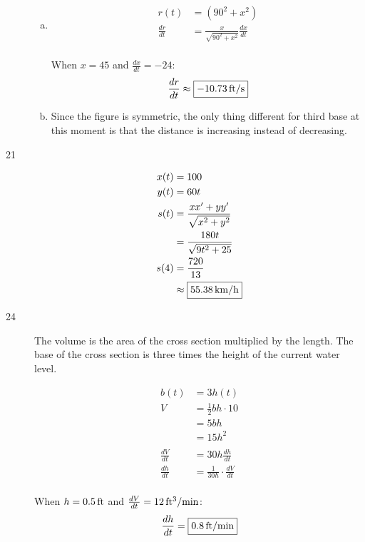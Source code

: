 \documentclass[letterpaper, landscape]{exam}
\begin{document}
\begin{description}
\begin{enumerate}[(a)]
        \item 
          \begin{align*}
            r(t)          & = \left( 90^2 + x^2 \right) \\
            \frac{dr}{dt} & = \frac{x}{\sqrt{90^2 + x^2}} \frac{dx}{dt} \\
          \end{align*}

          When $x = 45$ and $\frac{dx}{dt} = -24$:
          \[
            \frac{dr}{dt} \approx \boxed{ \unit[-10.73]{ft/s} }
          \]

        \item Since the figure is symmetric, the only thing different for third base at this moment
          is that the distance is increasing instead of decreasing.

      \end{enumerate}

    \item[21]
      \begin{align*}
        x(t) & = 100 \\
        y(t) & = 60t \\
        s(t) & = \frac{xx' + yy'}{\sqrt{x^2 + y^2}} \\
             & = \frac{180t}{\sqrt{9t^2 + 25}}
        \\
        s(4) & = \frac{720}{13} \\
             & \approx \boxed{ \unit[55.38]{km/h} } \\
      \end{align*}

    \newpage

    \item[24]
      The volume is the area of the cross section multiplied by the length. The base of the cross
      section is three times the height of the current water level.

      \begin{align*}
        b(t) & = 3 h(t) \\
        V    & = \frac{1}{2} bh \cdot 10 \\
             & = 5bh \\
             & = 15 h^2 \\
        \\
        \frac{dV}{dt} &= 30 h \frac{dh}{dt} \\
        \frac{dh}{dt} &= \frac{1}{30 h} \cdot \frac{dV}{dt} \\
      \end{align*}

      When $h = \unit[0.5]{ft}$ and $\frac{dV}{dt} = \unit[12]{ft^3/min}$:
      \[
        \frac{dh}{dt} = \boxed{ \unit[0.8]{ft/min} }
      \]

  \end{description}
\end{document}
